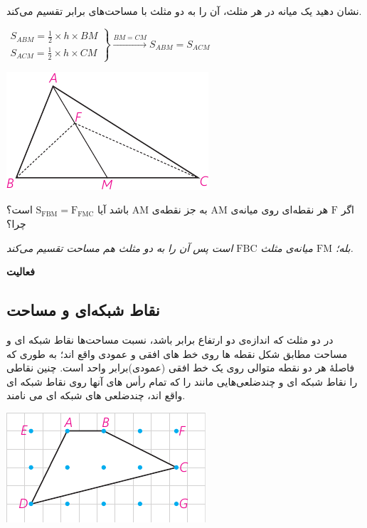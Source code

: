 \documentclass[12pt, a4paper, twoside]{book}
\begin{document}
 \begin{minipage}{0.65\textwidth}
 	نشان دهید یک میانه در هر مثلث، آن را به دو مثلث با مساحت‌های برابر تقسیم می‌کند.
 	\begin{flushleft}
 		$\left.
 		\begin{array}{ccc}
 			S_{ABM} = \frac12 \times h \times BM \\
 			S_{ACM} = \frac12 \times h \times CM
 		\end{array}
 		\right\}
 		\xrightarrow{BM = CM} S_{ABM} = S_{ACM}
 		$
 	\end{flushleft}
 \end{minipage}
 \begin{minipage}{0.3\textwidth}
 	\begin{flushleft}
 		\includegraphics{"Shapes/Fasl - 3/Dars 2/P66-S1"}
 	\end{flushleft}
 \end{minipage}

اگر $\mathrm{F}$ هر نقطه‌ای روی میانه‌ی $\mathrm{AM}$ به جز نقطه‌ی $\mathrm{AM}$ باشد آیا $\mathrm{S_{FBM} = F_{FMC}}$ است؟ چرا؟

\textit{بله؛ 
	$\mathrm{FM}$
	میانه‌ی مثلث 
	$\mathrm{FBC}$
	است پس آن را به دو مثلث هم مساحت تقسیم می‌کند.}

\textbf{فعالیت}



\subsection{نقاط شبکه‌ای و مساحت}

	  \begin{minipage}{0.7\textwidth}
در دو مثلث که اندازه‌ی دو ارتفاع برابر باشد، نسبت مساحت‌ها
نقاط شبکه ای و مساحت مطابق شکل نقطه ها روی خط های افقی و عمودی واقع اند؛ به طوری که فاصلهٔ هر دو نقطه متوالی روی یک خط افقی (عمودی)برابر واحد است. چنین نقاطی را نقاط شبکه ای و چندضلعی‌هایی مانند
را که تمام رأس های آنها روی نقاط شبکه ای واقع اند، چندضلعی های شبکه ای می نامند.
\end{minipage}   
\begin{minipage}{.3\textwidth}
	\begin{flushleft}
		\includegraphics{"Shapes/Fasl - 3/Dars 2/P69-S1.pdf"}
	\end{flushleft}
\end{minipage}
\end{document}
